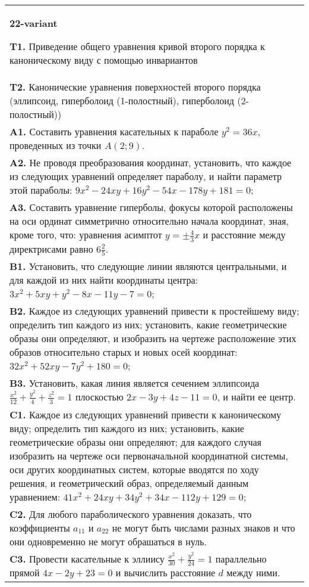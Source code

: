 \documentclass{article}
\begin{document}
\begin{tabular}{m{17cm}}
\textbf{22-variant}
\newline

\textbf{T1.} Приведение общего уравнения кривой второго порядка к каноническому виду с помощью инвариантов \\
\textbf{T2.} Канонические уравнения поверхностей второго порядка (эллипсоид, гиперболоид (1-полостный), гиперболоид (2-полостный)) \\
\textbf{A1.} Составить уравнения касательных к параболе $y^2=36 x$, проведенных из точки $A(2 ; 9)$. \\
\textbf{A2.} Не проводя преобразования координат, установить, что каждое из следующих уравнений определяет параболу, и найти параметр этой параболы: $9 x^2-24 x y+16 y^2-54 x-178 y+181=0$; \\
\textbf{A3.} Составить уравнение гиперболы, фокусы которой расположены на оси ординат симметрично относительно начала координат, зная, кроме того, что: уравнения асимптот $y= \pm \frac{4}{3} x$ и расстояние между директрисами равно $6 \frac{2}{5}$. \\
\textbf{B1.} Установить, что следующие линии являются центральными, и для каждой из них найти координаты центра: $3 x^2+5 x y+y^2-8 x-11 y-7=0$; \\
\textbf{B2.} Каждое из следующих уравнений привести к простейшему виду; определить тип каждого из них; установить, какие геометрические образы они определяют, и изобразить на чертеже расположение этих образов относительно старых и новых осей координат: $32 x^2+52 x y-7 y^2+180=0$; \\
\textbf{B3.} Установить, какая линия является сечением эллипсоида $\frac{x^2}{12}+\frac{y^2}{4}+\frac{z^2}{3}=1$ плоскостью $2 x-3 y+4 z-11=0$, и найти ее центр. \\
\textbf{C1.} Каждое из следующих уравнений привести к каноническому виду; определить тип каждого из них; установить, какие геометрические образы они определяют; для каждого случая изобразить на чертеже оси первоначальной координатной системы, оси других координатных систем, которые вводятся по ходу решения, и геометрический образ, определяемый данным уравнением: $41 x^2+24 x y+34 y^2+34 x-112 y+129=0$; \\
\textbf{C2.} Для любого параболического уравнения доказать, что коэффициенты $a_{11}$ и $a_{22}$ не могут быть числами разных знаков и что они одновременно не могут обрашаться в нуль. \\
\textbf{C3.} Провести касательные к эллиису $\frac{x^2}{30}+\frac{y^2}{24}=1$ параллельно прямой $4 x-2 y+23=0$ и вычислить расстояние $d$ между ними. \\

\end{tabular}
\vspace{1cm}
\end{document}
